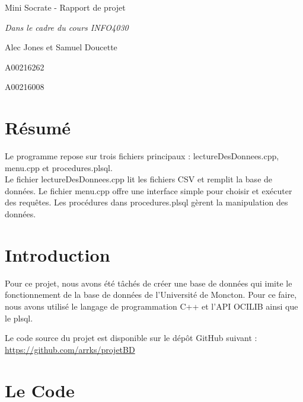 \documentclass[a4paper,12pt]{article}
\begin{document}
\begin{titlepage}
    \begin{center}
        \vspace*{2cm}
        {\huge Mini Socrate - Rapport de projet\par}
        \vspace{1cm}
        {\large \textit{Dans le cadre du cours INFO4030}\par}
        \vspace{2cm}
        {\large Alec Jones et Samuel Doucette\par}
        {\large A00216262\par}
        {\large A00216008\par}
    \end{center}
\end{titlepage}

\tableofcontents
\newpage

\section{Résumé}
Le programme repose sur trois fichiers principaux : lectureDesDonnees.cpp, menu.cpp et procedures.plsql. \\
\indent Le fichier lectureDesDonnees.cpp lit les fichiers CSV et remplit la base de données.
Le fichier menu.cpp offre une interface simple pour choisir et exécuter des requêtes.
Les procédures dans procedures.plsql gèrent la manipulation des données.

\section{Introduction}
Pour ce projet, nous avons été tâchés de créer une base de données qui
imite le fonctionnement de la base de données de l'Université de Moncton.
Pour ce faire, nous avons utilisé le langage de programmation C++ et l'API OCILIB ainsi que le plsql.

Le code source du projet est disponible sur le dépôt GitHub suivant : \url{https://github.com/arrks/projetBD}

\section{Le Code}
\end{document}
